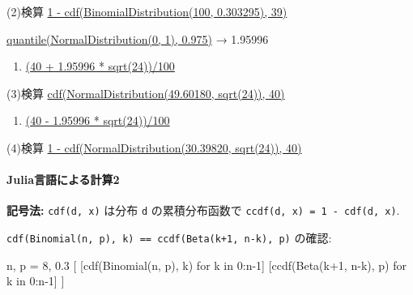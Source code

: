 \documentclass[
  letterpaper,
  DIV=11,
  numbers=noendperiod]{scrartcl}
\let\oldparagraph\paragraph
\renewcommand{\paragraph}[1]{\oldparagraph{#1}\mbox{}}
\newenvironment{Shaded}{\begin{snugshade}}{\end{snugshade}}
\newcommand{\CharTok}[1]{\textcolor[rgb]{0.13,0.47,0.30}{#1}}
\newcommand{\FloatTok}[1]{\textcolor[rgb]{0.68,0.00,0.00}{#1}}
\newcommand{\FunctionTok}[1]{\textcolor[rgb]{0.28,0.35,0.67}{#1}}
\newcommand{\KeywordTok}[1]{\textcolor[rgb]{0.00,0.23,0.31}{#1}}
\newcommand{\NormalTok}[1]{\textcolor[rgb]{0.00,0.23,0.31}{#1}}
\newcommand{\OperatorTok}[1]{\textcolor[rgb]{0.37,0.37,0.37}{#1}}
\providecommand{\tightlist}{%
  \setlength{\itemsep}{0pt}\setlength{\parskip}{0pt}}\usepackage{longtable,booktabs,array}
\begin{document}
(2)検算
\href{https://www.wolframalpha.com/input?i=1+-+cdf\%28BinomialDistribution\%28100\%2C+0.303295\%29\%2C+39\%29}{1
- cdf(BinomialDistribution(100, 0.303295), 39)}

\href{https://www.wolframalpha.com/input?i=quantile\%28NormalDistribution\%280\%2C+1\%29\%2C+0.975\%29}{quantile(NormalDistribution(0,
1), 0.975)} → 1.95996

\begin{enumerate}
\def\labelenumi{(\arabic{enumi})}
\setcounter{enumi}{2}
\tightlist
\item
  \href{https://www.wolframalpha.com/input?i=\%2840+\%2B+1.95996+*+sqrt\%2824\%29\%29\%2F100}{(40
  + 1.95996 * sqrt(24))/100}
\end{enumerate}

(3)検算
\href{https://www.wolframalpha.com/input?i=cdf\%28NormalDistribution\%2849.60180\%2C+sqrt\%2824\%29\%29\%2C+40\%29}{cdf(NormalDistribution(49.60180,
sqrt(24)), 40)}

\begin{enumerate}
\def\labelenumi{(\arabic{enumi})}
\setcounter{enumi}{3}
\tightlist
\item
  \href{https://www.wolframalpha.com/input?i=\%2840+-+1.95996+*+sqrt\%2824\%29\%29\%2F100}{(40
  - 1.95996 * sqrt(24))/100}
\end{enumerate}

(4)検算
\href{https://www.wolframalpha.com/input?i=1+-+cdf\%28NormalDistribution\%2830.39820\%2C+sqrt\%2824\%29\%29\%2C+40\%29}{1
- cdf(NormalDistribution(30.39820, sqrt(24)), 40)}

\hypertarget{juliaux8a00ux8a9eux306bux3088ux308bux8a08ux7b972}{%
\paragraph{Julia言語による計算2}\label{juliaux8a00ux8a9eux306bux3088ux308bux8a08ux7b972}}

\textbf{記号法:} \texttt{cdf(d,\ x)} は分布 \texttt{d} の累積分布函数で
\texttt{ccdf(d,\ x)\ =\ 1\ -\ cdf(d,\ x)}.

\texttt{cdf(Binomial(n,\ p),\ k)\ ==\ ccdf(Beta(k+1,\ n-k),\ p)} の確認:

\begin{Shaded}
\begin{Highlighting}[]
\NormalTok{n, p }\OperatorTok{=} \FloatTok{8}\NormalTok{, }\FloatTok{0.3}
\NormalTok{[}
\NormalTok{    [}\FunctionTok{cdf}\NormalTok{(}\FunctionTok{Binomial}\NormalTok{(n, p), k) for k }\KeywordTok{in} \FloatTok{0}\OperatorTok{:}\NormalTok{n}\OperatorTok{{-}}\FloatTok{1}\NormalTok{]}\CharTok{\textquotesingle{}}
\NormalTok{    [}\FunctionTok{ccdf}\NormalTok{(}\FunctionTok{Beta}\NormalTok{(k}\OperatorTok{+}\FloatTok{1}\NormalTok{, n}\OperatorTok{{-}}\NormalTok{k), p) for k }\KeywordTok{in} \FloatTok{0}\OperatorTok{:}\NormalTok{n}\OperatorTok{{-}}\FloatTok{1}\NormalTok{]}\CharTok{\textquotesingle{}}
\NormalTok{]}
\end{Highlighting}
\end{Shaded}
\end{document}
